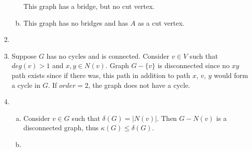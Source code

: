 \documentclass[11pt]{article}
\begin{document}
\begin{enumerate}[1.]
\begin{enumerate}[a)]
                
                This graph has a bridge, but no cut vertex. 

            \item

                This graph has no bridges and has $A$ as a cut vertex.
        \end{enumerate}

    \item %
        

    \item %
        Suppose $G$ has no cycles and is connected. Consider $v \in V$ such that 
        $deg(v) > 1$ and $x,y \in N(v)$. Graph $G - \{v\}$ is disconnected since 
        no $xy$ path exists since if there was, this path in addition to 
        path $x$, $v$, $y$ would form a cycle in $G$. If $order = 2$, the graph does 
        not have a cycle. 
    \item %
        \begin{enumerate}[a)]
            \item
                Consider $v \in G$ such that $\delta(G) = |N(v)|$. Then 
                $G - N(v)$ is a disconnected graph, thus $\kappa(G) \leq \delta(G)$.
            \item
                
        \end{enumerate}


\end{enumerate}
\end{document}
